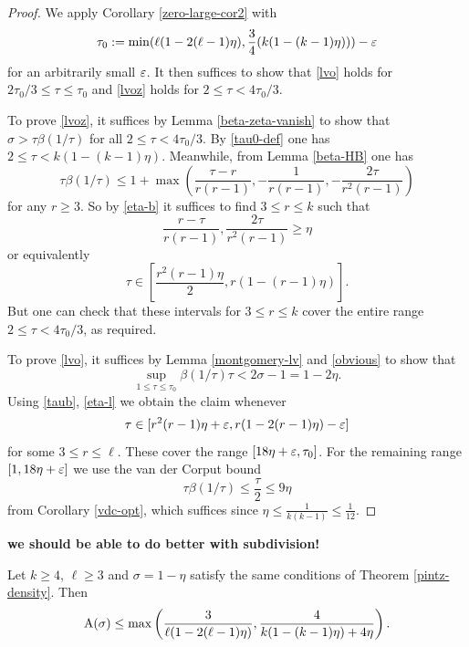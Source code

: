 \begin{proof} We apply Corollary \ref{zero-large-cor2} with
\begin{equation}\label{tau0-def}
\tau_0 := \min( \ell (1 - 2(\ell-1) \eta), \frac{3}{4} (k(1-(k-1)\eta)) ) - \varepsilon
\end{equation}
for an arbitrarily small $\varepsilon$.
It then suffices to show that \eqref{lvo} holds for $2\tau_0/3 \leq \tau \leq \tau_0$ and \eqref{lvoz} holds for $2 \leq \tau < 4\tau_0/3$.

To prove \eqref{lvoz}, it suffices by Lemma \ref{beta-zeta-vanish} to show that $\sigma > \tau \beta(1/\tau)$ for all $2 \leq \tau < 4 \tau_0/3$.  By \eqref{tau0-def} one has $2 \leq \tau < k(1-(k-1)\eta)$.  Meanwhile, from Lemma \ref{beta-HB} one has
\begin{equation}\label{taub}
\tau \beta(1/\tau) \leq 1 + \max\left( \frac{\tau-r}{r(r-1)}, -\frac{1}{r(r-1)}, - \frac{2\tau}{r^2(r-1)}\right)
\end{equation}
for any $r \geq 3$.  So by \eqref{eta-b} it suffices to find $3 \leq r \leq k$ such that
$$ \frac{r-\tau}{r(r-1)}, \frac{2\tau}{r^2(r-1)} \geq \eta$$
or equivalently
$$ \tau \in [\frac{r^2(r-1)\eta}{2}, r(1-(r-1)\eta)].$$
But one can check that these intervals for $3 \leq r \leq k$ cover the entire range $2 \leq \tau < 4\tau_0/3$, as required.

To prove \eqref{lvo}, it suffices by Lemma \ref{montgomery-lv} and \eqref{obvious} to show that
$$ \sup_{1 \leq \tau \leq \tau_0} \beta(1/\tau) \tau < 2\sigma - 1 = 1 - 2 \eta.$$
Using \eqref{taub}, \eqref{eta-l} we obtain the claim whenever
$$ \tau \in [r^2(r-1)\eta+\varepsilon, r(1-2(r-1)\eta)-\varepsilon]$$
for some $3 \leq r \leq \ell$.  These cover the range $[18\eta+\varepsilon, \tau_0]$.  For the remaining range $[1, 18\eta+\varepsilon]$ we use the van der Corput bound
$$ \tau \beta(1/\tau) \leq \frac{\tau}{2} \leq 9 \eta$$
from Corollary \ref{vdc-opt}, which suffices since $\eta \leq \frac{1}{k(k-1)} \leq \frac{1}{12}$.
\end{proof}


{\bf we should be able to do better with subdivision!}

\begin{theorem}\label{pintz-density-subdiv} Let $k \geq 4$, $\ell \geq 3$ and $\sigma = 1-\eta$ satisfy the same conditions of Theorem \ref{pintz-density}. Then
$$ \mathrm{A}(\sigma) \leq \max\left( \frac{3}{\ell(1-2(\ell-1)\eta)}, \frac{4}{k(1 - (k - 1)\eta) + 4\eta}\right).$$
\end{theorem}

